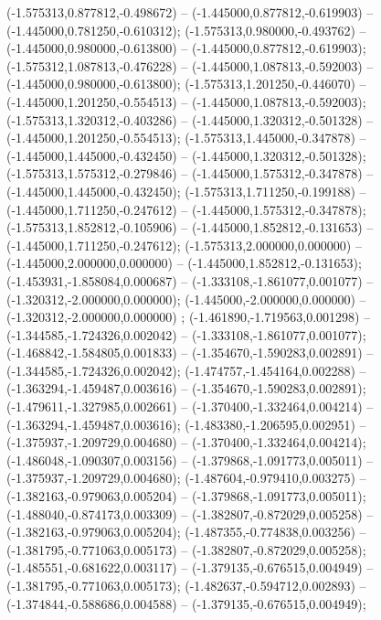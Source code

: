  (-1.575313,0.877812,-0.498672) -- (-1.445000,0.877812,-0.619903) -- (-1.445000,0.781250,-0.610312);
 (-1.575313,0.980000,-0.493762) -- (-1.445000,0.980000,-0.613800) -- (-1.445000,0.877812,-0.619903);
 (-1.575312,1.087813,-0.476228) -- (-1.445000,1.087813,-0.592003) -- (-1.445000,0.980000,-0.613800);
 (-1.575313,1.201250,-0.446070) -- (-1.445000,1.201250,-0.554513) -- (-1.445000,1.087813,-0.592003);
 (-1.575313,1.320312,-0.403286) -- (-1.445000,1.320312,-0.501328) -- (-1.445000,1.201250,-0.554513);
 (-1.575313,1.445000,-0.347878) -- (-1.445000,1.445000,-0.432450) -- (-1.445000,1.320312,-0.501328);
 (-1.575313,1.575312,-0.279846) -- (-1.445000,1.575312,-0.347878) -- (-1.445000,1.445000,-0.432450);
 (-1.575313,1.711250,-0.199188) -- (-1.445000,1.711250,-0.247612) -- (-1.445000,1.575312,-0.347878);
 (-1.575313,1.852812,-0.105906) -- (-1.445000,1.852812,-0.131653) -- (-1.445000,1.711250,-0.247612);
 (-1.575313,2.000000,0.000000) -- (-1.445000,2.000000,0.000000) -- (-1.445000,1.852812,-0.131653);
 (-1.453931,-1.858084,0.000687) -- (-1.333108,-1.861077,0.001077) -- (-1.320312,-2.000000,0.000000);
 (-1.445000,-2.000000,0.000000) -- (-1.320312,-2.000000,0.000000) ;
 (-1.461890,-1.719563,0.001298) -- (-1.344585,-1.724326,0.002042) -- (-1.333108,-1.861077,0.001077);
 (-1.468842,-1.584805,0.001833) -- (-1.354670,-1.590283,0.002891) -- (-1.344585,-1.724326,0.002042);
 (-1.474757,-1.454164,0.002288) -- (-1.363294,-1.459487,0.003616) -- (-1.354670,-1.590283,0.002891);
 (-1.479611,-1.327985,0.002661) -- (-1.370400,-1.332464,0.004214) -- (-1.363294,-1.459487,0.003616);
 (-1.483380,-1.206595,0.002951) -- (-1.375937,-1.209729,0.004680) -- (-1.370400,-1.332464,0.004214);
 (-1.486048,-1.090307,0.003156) -- (-1.379868,-1.091773,0.005011) -- (-1.375937,-1.209729,0.004680);
 (-1.487604,-0.979410,0.003275) -- (-1.382163,-0.979063,0.005204) -- (-1.379868,-1.091773,0.005011);
 (-1.488040,-0.874173,0.003309) -- (-1.382807,-0.872029,0.005258) -- (-1.382163,-0.979063,0.005204);
 (-1.487355,-0.774838,0.003256) -- (-1.381795,-0.771063,0.005173) -- (-1.382807,-0.872029,0.005258);
 (-1.485551,-0.681622,0.003117) -- (-1.379135,-0.676515,0.004949) -- (-1.381795,-0.771063,0.005173);
 (-1.482637,-0.594712,0.002893) -- (-1.374844,-0.588686,0.004588) -- (-1.379135,-0.676515,0.004949);
